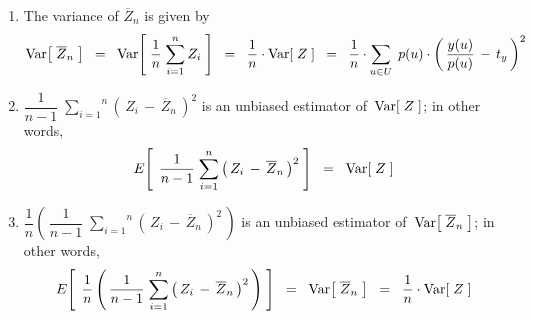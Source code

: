 \begin{theorem}
\begin{enumerate}
\item
	The variance of \;$\overline{Z}_{n}$ is given by
	\begin{equation*}
	\textnormal{Var}\!\left[\;\overline{Z}_{n}\;\right]
	\;\; = \;\;
		\textnormal{Var}\!\left[\;\dfrac{1}{n}\;\overset{n}{\underset{i=1}{\sum}}\,Z_{i}\;\right]
	\;\; = \;\;
		\dfrac{1}{n}\cdot\textnormal{Var}\!\left[\;Z\;\right]
	\;\; = \;\;
		\dfrac{1}{n} \cdot \underset{u \in U}{\sum}\;\,p(u)\cdot\left(\,\dfrac{y(u)}{p(u)}\,-\,t_{y}\,\right)^{2}
	\end{equation*}
\item
	$\dfrac{1}{n-1}\;\overset{n}{\underset{i=1}{\sum}}\left(\,Z_{i} \,-\, \overline{Z}_{n}\,\right)^{2}$\;
	is an unbiased estimator of \,$\textnormal{Var}\!\left[\;Z\;\right]$; in other words,	
	\begin{equation*}
	E\!\left[\;\,\dfrac{1}{n-1}\;\overset{n}{\underset{i=1}{\sum}}\left(\,Z_{i} \,-\, \overline{Z}_{n}\,\right)^{2}\;\right]
	\;\; = \;\;
		\textnormal{Var}\!\left[\;Z\;\right]
	\end{equation*}
\item
	$\dfrac{1}{n}\left(\,\dfrac{1}{n-1}\;\overset{n}{\underset{i=1}{\sum}}\left(\,Z_{i} \,-\, \overline{Z}_{n}\,\right)^{2}\,\right)$\;
	is an unbiased estimator of \,$\textnormal{Var}\!\left[\;\overline{Z}_{n}\;\right]$; in other words,	
	\begin{equation*}
	E\!\left[\;\,\dfrac{1}{n}\left(\,\dfrac{1}{n-1}\;\overset{n}{\underset{i=1}{\sum}}\left(\,Z_{i} \,-\, \overline{Z}_{n}\,\right)^{2}\,\right)\;\right]
	\;\; = \;\;
		\textnormal{Var}\!\left[\;\overline{Z}_{n}\;\right]
	\;\; = \;\;
		\dfrac{1}{n}\cdot\textnormal{Var}\!\left[\;Z\;\right]
	\end{equation*}
\end{enumerate}
\end{theorem}
\proof
